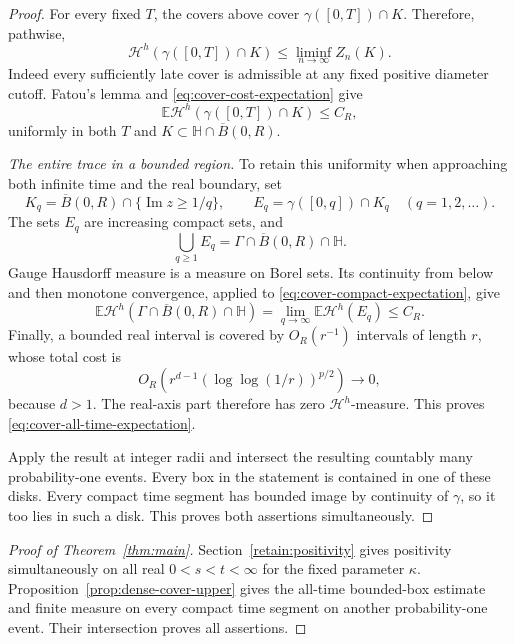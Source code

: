 \documentclass[11pt]{article}
\theoremstyle{definition}
\theoremstyle{remark}
\numberwithin{equation}{section}
\begin{document}
\begin{proof}
For every fixed \(T\), the covers above cover
\(\gamma([0,T])\cap K\).  Therefore, pathwise,
\[
 \mathcal H^h(\gamma([0,T])\cap K)
       \le\liminf_{n\to\infty}Z_n(K).
\]
Indeed every sufficiently late cover is admissible at any
fixed positive diameter cutoff.  Fatou's lemma and
\eqref{eq:cover-cost-expectation} give
\begin{equation}
 \mathbb E\mathcal H^h(\gamma([0,T])\cap K)\le C_R,
 \label{eq:cover-compact-expectation}
\end{equation}
uniformly in both \(T\) and \(K\subset\mathbb H\cap\overline B(0,R)\).

\emph{The entire trace in a bounded region.}
To retain this uniformity when approaching both infinite time
and the real boundary, set
\[
 K_q=\overline B(0,R)\cap\{\operatorname{Im}z\ge1/q\},
 \qquad E_q=\gamma([0,q])\cap K_q
       \quad(q=1,2,\ldots).
\]
The sets \(E_q\) are increasing compact sets, and
\[
 \bigcup_{q\ge1}E_q=\Gamma\cap\overline B(0,R)\cap\mathbb H.
\]
Gauge Hausdorff measure is a measure on Borel sets.  Its
continuity from below and then monotone convergence, applied
to \eqref{eq:cover-compact-expectation}, give
\[
 \mathbb E\mathcal H^h
       (\Gamma\cap\overline B(0,R)\cap\mathbb H)
    =\lim_{q\to\infty}\mathbb E\mathcal H^h(E_q)
    \le C_R.
\]
Finally, a bounded real interval is covered by \(O_R(r^{-1})\)
intervals of length \(r\), whose total cost is
\[
 O_R\!\left(r^{d-1}(\log\log(1/r))^{p/2}\right)\longrightarrow0,
\]
because \(d>1\).  The real-axis part therefore has zero
\(\mathcal H^h\)-measure.  This proves
\eqref{eq:cover-all-time-expectation}.

Apply the result at integer radii and intersect the resulting
countably many probability-one events.  Every box in the
statement is contained in one of these disks.  Every compact
time segment has bounded image by continuity of \(\gamma\),
so it too lies in such a disk.  This proves both assertions
simultaneously.
\end{proof}

\begin{proof}[Proof of Theorem~\ref{thm:main}]
Section~\ref{retain:positivity} gives positivity simultaneously on all real
$0<s<t<\infty$ for the fixed parameter $\kappa$.
Proposition~\ref{prop:dense-cover-upper} gives the all-time bounded-box
estimate and finite measure on every compact time segment on another
probability-one event. Their intersection proves all assertions.
\end{proof}

{}

\begingroup
\RaggedRight

\endgroup
\end{document}
